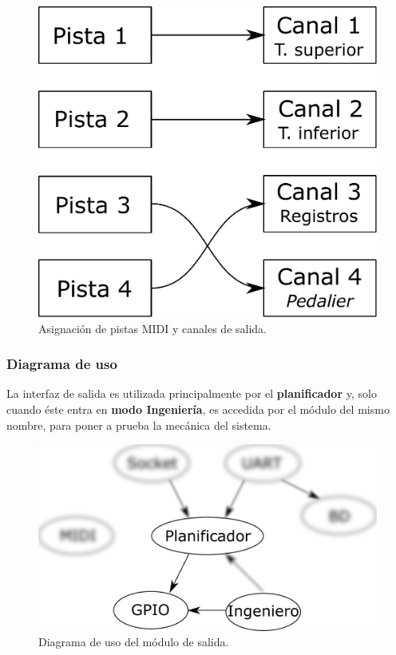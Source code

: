 \begin{figure}[H]
	\noindent \begin{centering}
		\includegraphics[width=\linewidth/3]{capitulo4/map}
		\par\end{centering}
	\smallskip
	\caption{\label{fig:map} Asignación de pistas MIDI y canales de salida.}
\end{figure} 

\smallskip

\subsubsection{Diagrama de uso}

La interfaz de salida es utilizada principalmente por el \textbf{planificador} y, solo cuando éste entra en \textbf{modo Ingeniería}, es accedida por el módulo del mismo nombre, para poner a prueba la mecánica del sistema.

\smallskip

\begin{figure}[H]
	\noindent \begin{centering}
		\includegraphics[width=\linewidth/2]{capitulo4/daemon_gpio}
		\par\end{centering}
	\smallskip
	\caption{\label{fig:daemon_gpio} Diagrama de uso del módulo de salida.}
\end{figure} 

